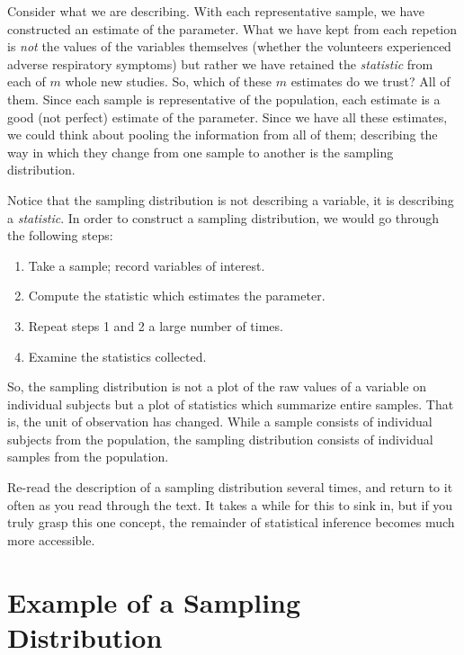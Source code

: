 \documentclass[]{book}
\providecommand{\tightlist}{%
  \setlength{\itemsep}{0pt}\setlength{\parskip}{0pt}}
\theoremstyle{definition}
\theoremstyle{definition}
\theoremstyle{definition}
\theoremstyle{remark}
\let\BeginKnitrBlock\begin \let\EndKnitrBlock\end
\begin{document}
Consider what we are describing. With each representative sample, we
have constructed an estimate of the parameter. What we have kept from
each repetion is \emph{not} the values of the variables themselves
(whether the volunteers experienced adverse respiratory symptoms) but
rather we have retained the \emph{statistic} from each of \(m\) whole
new studies. So, which of these \(m\) estimates do we trust? All of
them. Since each sample is representative of the population, each
estimate is a good (not perfect) estimate of the parameter. Since we
have all these estimates, we could think about pooling the information
from all of them; describing the way in which they change from one
sample to another is the sampling distribution.

Notice that the sampling distribution is not describing a variable, it
is describing a \emph{statistic}. In order to construct a sampling
distribution, we would go through the following steps:

\begin{enumerate}
\def\labelenumi{\arabic{enumi}.}
\tightlist
\item
  Take a sample; record variables of interest.
\item
  Compute the statistic which estimates the parameter.
\item
  Repeat steps 1 and 2 a large number of times.
\item
  Examine the statistics collected.
\end{enumerate}

So, the sampling distribution is not a plot of the raw values of a
variable on individual subjects but a plot of statistics which summarize
entire samples. That is, the unit of observation has changed. While a
sample consists of individual subjects from the population, the sampling
distribution consists of individual samples from the population.

\BeginKnitrBlock{rmdtip}
Re-read the description of a sampling distribution several times, and
return to it often as you read through the text. It takes a while for
this to sink in, but if you truly grasp this one concept, the remainder
of statistical inference becomes much more accessible.
\EndKnitrBlock{rmdtip}

\section{Example of a Sampling
Distribution}\label{example-of-a-sampling-distribution}
\end{document}
